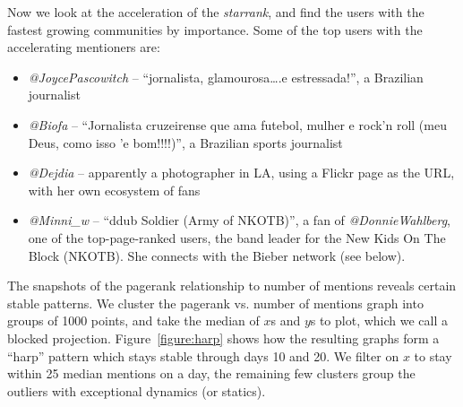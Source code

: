 \documentclass[10pt,oneside]{memoir}
\begin{document}
Now we look at the acceleration of the {\itshape starrank}, and find the users with the fastest growing communities by importance.  Some of the top users with the accelerating mentioners are:


\begin{itemize}


\item {\itshape @JoycePascowitch} -- ``jornalista, glamourosa{\ldots}.e estressada!'', a Brazilian journalist

\item {\itshape @Biofa} -- ``Jornalista cruzeirense que ama futebol, mulher e rock'n roll (meu Deus, como isso '{e} bom!!!!)'', a Brazilian sports journalist

\item {\itshape @Dejdia} -- apparently a photographer in LA, using a Flickr page as the URL, with her own ecosystem of fans

\item \emph{@Minni\_w} -- ``ddub Soldier (Army of NKOTB)'', a fan of {\itshape @DonnieWahlberg}, one of the top-page-ranked users, the band leader for the New Kids On The Block (NKOTB).  She connects with the Bieber network (see below).
\end{itemize}

The snapshots of the pagerank relationship to number of mentions reveals certain stable patterns.  We cluster the pagerank vs. number of mentions graph into groups of 1000 points, and take the median of $x$s and $y$s to plot, which we call a blocked projection.  Figure~\ref{figure:harp} shows how the resulting graphs form a ``harp'' pattern which stays stable through days 10 and 20.  We filter on $x$ to stay within 25 median mentions on a day, the remaining few clusters group the outliers with exceptional dynamics (or statics).
\end{document}
